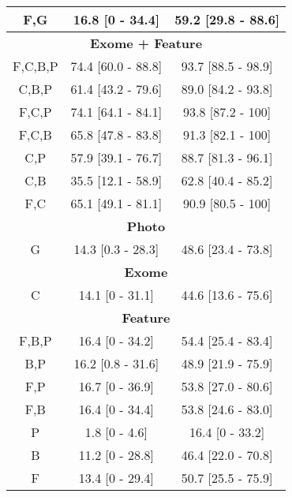\begin{center}
\begin{table}[ht]
\begin{tabular}{|c|c|c|}
F,G&16.8 \small{[0 - 34.4]} & 59.2 \small{[29.8 - 88.6]}\\ \hline 
\multicolumn{3}{|c|}{\textbf{Exome + Feature}}\\ \hline 
F,C,B,P&74.4 \small{[60.0 - 88.8]} & 93.7 \small{[88.5 - 98.9]}\\ \hline 
C,B,P&61.4 \small{[43.2 - 79.6]} & 89.0 \small{[84.2 - 93.8]}\\ \hline 
F,C,P&74.1 \small{[64.1 - 84.1]} & 93.8 \small{[87.2 - 100]}\\ \hline 
F,C,B&65.8 \small{[47.8 - 83.8]} & 91.3 \small{[82.1 - 100]}\\ \hline 
C,P&57.9 \small{[39.1 - 76.7]} & 88.7 \small{[81.3 - 96.1]}\\ \hline 
C,B&35.5 \small{[12.1 - 58.9]} & 62.8 \small{[40.4 - 85.2]}\\ \hline 
F,C&65.1 \small{[49.1 - 81.1]} & 90.9 \small{[80.5 - 100]}\\ \hline 
\multicolumn{3}{|c|}{\textbf{Photo}}\\ \hline 
G&14.3 \small{[0.3 - 28.3]} & 48.6 \small{[23.4 - 73.8]}\\ \hline 
\multicolumn{3}{|c|}{\textbf{Exome}}\\ \hline 
C&14.1 \small{[0 - 31.1]} & 44.6 \small{[13.6 - 75.6]}\\ \hline 
\multicolumn{3}{|c|}{\textbf{Feature}}\\ \hline 
F,B,P&16.4 \small{[0 - 34.2]} & 54.4 \small{[25.4 - 83.4]}\\ \hline 
B,P&16.2 \small{[0.8 - 31.6]} & 48.9 \small{[21.9 - 75.9]}\\ \hline 
F,P&16.7 \small{[0 - 36.9]} & 53.8 \small{[27.0 - 80.6]}\\ \hline 
F,B&16.4 \small{[0 - 34.4]} & 53.8 \small{[24.6 - 83.0]}\\ \hline 
P&1.8 \small{[0 - 4.6]} & 16.4 \small{[0 - 33.2]}\\ \hline 
B&11.2 \small{[0 - 28.8]} & 46.4 \small{[22.0 - 70.8]}\\ \hline 
F&13.4 \small{[0 - 29.4]} & 50.7 \small{[25.5 - 75.9]}\\ \hline 
\end{tabular}
\end{table}
\end{center}
